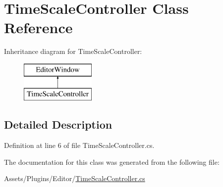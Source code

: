 \hypertarget{class_time_scale_controller}{}\section{Time\+Scale\+Controller Class Reference}
\label{class_time_scale_controller}
Inheritance diagram for Time\+Scale\+Controller\+:\begin{figure}[H]
\begin{center}
\leavevmode
\includegraphics[height=2.000000cm]{class_time_scale_controller}
\end{center}
\end{figure}


\subsection{Detailed Description}


Definition at line 6 of file Time\+Scale\+Controller.\+cs.



The documentation for this class was generated from the following file\+:\begin{DoxyCompactItemize}
\item 
Assets/\+Plugins/\+Editor/\mbox{\hyperlink{_time_scale_controller_8cs}{Time\+Scale\+Controller.\+cs}}\end{DoxyCompactItemize}
